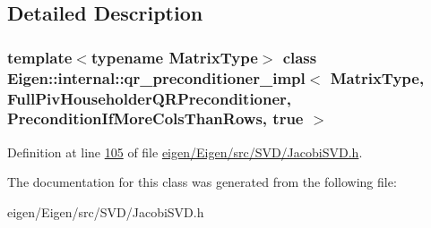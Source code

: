 \subsection{Detailed Description}
\subsubsection*{template$<$typename Matrix\+Type$>$\newline
class Eigen\+::internal\+::qr\+\_\+preconditioner\+\_\+impl$<$ Matrix\+Type, Full\+Piv\+Householder\+Q\+R\+Preconditioner, Precondition\+If\+More\+Cols\+Than\+Rows, true $>$}



Definition at line \hyperlink{eigen_2_eigen_2src_2_s_v_d_2_jacobi_s_v_d_8h_source_l00105}{105} of file \hyperlink{eigen_2_eigen_2src_2_s_v_d_2_jacobi_s_v_d_8h_source}{eigen/\+Eigen/src/\+S\+V\+D/\+Jacobi\+S\+V\+D.\+h}.



The documentation for this class was generated from the following file\+:\begin{DoxyCompactItemize}
\item 
eigen/\+Eigen/src/\+S\+V\+D/\+Jacobi\+S\+V\+D.\+h\end{DoxyCompactItemize}
